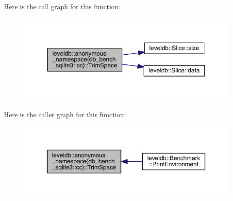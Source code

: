 Here is the call graph for this function\+:
\nopagebreak
\begin{figure}[H]
\begin{center}
\leavevmode
\includegraphics[width=339pt]{namespaceleveldb_1_1anonymous__namespace_02db__bench__sqlite3_8cc_03_aa195c9715d46a80a05309928d8be9e78_cgraph}
\end{center}
\end{figure}




Here is the caller graph for this function\+:
\nopagebreak
\begin{figure}[H]
\begin{center}
\leavevmode
\includegraphics[width=343pt]{namespaceleveldb_1_1anonymous__namespace_02db__bench__sqlite3_8cc_03_aa195c9715d46a80a05309928d8be9e78_icgraph}
\end{center}
\end{figure}


